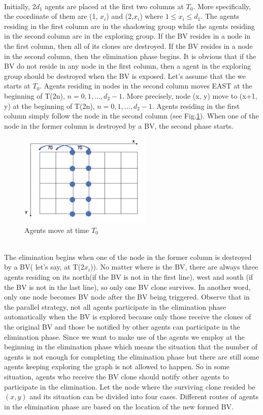  \\
Initially, 2$d_1$ agents are placed at the first two columns at $T_0$. More specifically, the coordinate of them are (1, $x_i$) and (2,$x_i$) where $1\leq x_i\leq d_1$. The agents residing in the first column are in the shadowing group while the agents residing in the second column are in the exploring group. If the BV resides in a node in the first column, then all of its clones are destroyed. If the BV resides in a node in the second column, then the elimination phase begins. It is obvious that if the BV do not reside in any node in the first column, then a agent in the exploring group should be destroyed when the BV is exposed.  Let's assume that the we starts at $T_0$. Agents residing in nodes in the second column moves EAST at the beginning of T(2n), $n=0,1, \ldots ,d_2-1$. More precisely, node (x, y) move to (x+1, y) at the beginning of T(2n), $n=0,1, \dots , d_2-1$. Agents residing in the first column simply follow the node in the second column (see  Fig.\ref{fig:TShE}). When one of the node in the former column is destroyed by a BV, the second phase starts.
\begin{figure}[H]
  \centering  
  \includegraphics[width=2.5in]{figures/TShE.png}
  \caption{Agents move at time $T_0$}\label{fig:TShE}
\end{figure}
\\
The elimination begins when one of the node in the former column is destroyed by a BV( let's say, at T(2$x_i$)). No matter where is the BV, there are always three agents residing on its north(if the BV is not in the first line), west and south (if the BV is not in the last line), so only one BV clone survives. In another word, only one node becomes BV node after the BV being triggered.  Observe that in the parallel strategy, not all agents participate in the elimination phase automatically when the BV is explored because only those receive the clones of the original BV and those be notified by other agents can participate in the elimination phase. Since we want to make use of the agents we employ at the beginning in the elimination phase which means the situation that the number of agents is not enough for completing the elimination phase but there are still some agents keeping exploring the graph is not allowed to happen. So in some situation, agents who receive the BV clone should notify other agents to participate in the elimination.  Let the node where the surviving clone resided be $(x, y)$ and its situation can be divided into four cases. Different routes of agents in the elimination phase are based on the location of the new formed BV.
